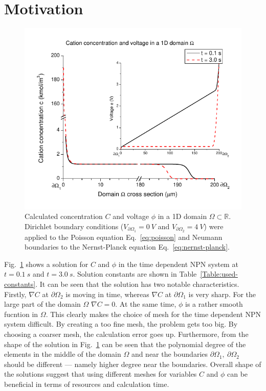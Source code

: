 \section{Motivation}
\begin{figure}
  \begin{centering}
      \includegraphics[]{comsol_conc_volt}
  \caption{\label{fig:comsol-conc-volt}Calculated concentration $C$ and voltage $\phi$
  in a 1D domain $\Omega\subset\mathbb{R}$.
  Dirichlet boundary conditions ($V_{\partial \Omega_1}=0\ V$
  and $V_{\partial \Omega_2}=4\ V$) were
	applied to the Poisson equation Eq.~\eqref{eq:poisson} and Neumann boundaries
	to the Nernst-Planck equation Eq.~\eqref{eq:nernst-planck}.}
  \end{centering}
\end{figure}
Fig.~\ref{fig:comsol-conc-volt} shows a solution for $C$ and $\phi$ in
the time dependent NPN system at $t=0.1\ s$ and $t=3.0\ s$. Solution
constants are shown in Table~\ref{Table:used-constants}.
It can be seen that the solution has two notable characteristics. 
Firstly, $\nabla C$ at $\partial \Omega_2$ is
moving in time, whereas $\nabla C$ at $\partial \Omega_1$ is very
sharp. For the large part of the domain $\Omega$ $\nabla C=0$.
At the same time, $\phi$ is a rather smooth fucntion in $\Omega$.
This clearly makes the choice of mesh for the time dependent NPN
system difficult. By creating a too fine mesh, the problem gets
too big. By choosing a coarser mesh, the calculation error goes up.
Furthermore, from the shape of the solution in Fig.~\ref{fig:comsol-conc-volt}
can be seen that the polynomial degree of the elements in the middle
of the domain $\Omega$ and near the boundaries $\partial \Omega_1,\ \partial \Omega_2$
should be different --- namely higher degree near the boundaries. 
Overall shape of the solutions suggest that
using different meshes for variables $C$ and $\phi$ can be beneficial
in terms of resources and calculation time.

